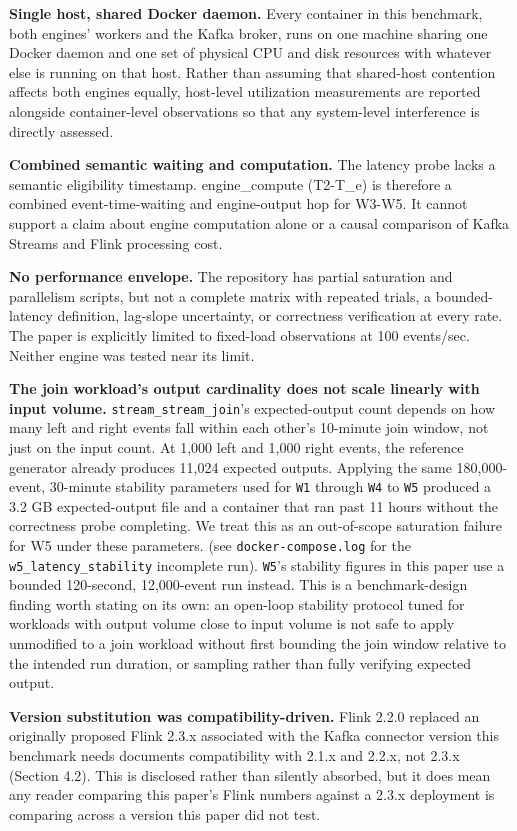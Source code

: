 \documentclass[
]{article}
\begin{document}
\textbf{Single host, shared Docker daemon.} Every container in this
benchmark, both engines' workers and the Kafka broker, runs on one
machine sharing one Docker daemon and one set of physical CPU and disk
resources with whatever else is running on that host.
Rather than assuming that shared-host contention affects both engines
equally, host-level utilization measurements are reported alongside
container-level observations so that any system-level interference is
directly assessed.

\textbf{Combined semantic waiting and computation.} The latency probe
lacks a semantic eligibility timestamp. engine_compute (T2-T_e) is therefore a
combined event-time-waiting and engine-output hop for W3-W5. It cannot
support a claim about engine computation alone or a causal comparison of
Kafka Streams and Flink processing cost.

\textbf{No performance envelope.} The repository has partial saturation
and parallelism scripts, but not a complete matrix with repeated trials,
a bounded-latency definition, lag-slope uncertainty, or correctness
verification at every rate. The paper is explicitly limited to fixed-load 
observations at 100 events/sec. Neither engine was tested near its limit.

\textbf{The join workload's output cardinality does not scale linearly
with input volume.} \texttt{stream\_stream\_join}'s expected-output
count depends on how many left and right events fall within each other's
10-minute join window, not just on the input count. At 1,000 left and
1,000 right events, the reference generator already produces 11,024
expected outputs. Applying the same 180,000-event, 30-minute stability
parameters used for \texttt{W1} through \texttt{W4} to \texttt{W5}
produced a 3.2 GB expected-output file and a container that ran past 11
hours without the correctness probe completing. We treat this as an
out-of-scope saturation failure for W5 under these parameters. (see
\texttt{docker-compose.log} for the \texttt{w5\_latency\_stability}
incomplete run). \texttt{W5}'s stability figures in this paper use a
bounded 120-second, 12,000-event run instead. This is a benchmark-design
finding worth stating on its own: an open-loop stability protocol tuned
for workloads with output volume close to input volume is not safe to
apply unmodified to a join workload without first bounding the join
window relative to the intended run duration, or sampling rather than
fully verifying expected output.

\textbf{Version substitution was compatibility-driven.} Flink 2.2.0
replaced an originally proposed Flink 2.3.x associated with the Kafka connector
version this benchmark needs documents compatibility with 2.1.x and
2.2.x, not 2.3.x (Section 4.2). This is disclosed rather than silently
absorbed, but it does mean any reader comparing this paper's Flink
numbers against a 2.3.x deployment is comparing across a version this
paper did not test.
\end{document}
